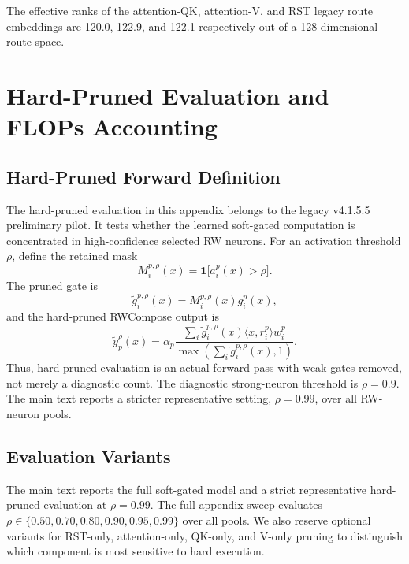 \documentclass{article}
\begin{document}
The effective ranks of the attention-QK, attention-V, and RST legacy route embeddings are 120.0, 122.9, and 122.1 respectively out of a 128-dimensional route space.


\section{Hard-Pruned Evaluation and FLOPs Accounting}
\label{app:hard_pruned_eval}
\label{app:flops_accounting_40m}

\subsection{Hard-Pruned Forward Definition}

The hard-pruned evaluation in this appendix belongs to the legacy v4.1.5.5 preliminary pilot. It tests whether the learned soft-gated computation is concentrated in high-confidence selected RW neurons. For an activation threshold $\rho$, define the retained mask
\begin{equation}
    M_i^{p,\rho}(x)=\mathbf{1}\bigl[a_i^p(x)>\rho\bigr].
\end{equation}
The pruned gate is
\begin{equation}
    \tilde g_i^{p,\rho}(x)=M_i^{p,\rho}(x)g_i^p(x),
\end{equation}
and the hard-pruned RWCompose output is
\begin{equation}
    \tilde y_p^\rho(x)=\alpha_p
    \frac{\sum_i \tilde g_i^{p,\rho}(x)\langle x,r_i^p\rangle w_i^p}
    {\max(\sum_i \tilde g_i^{p,\rho}(x),1)} .
\end{equation}
Thus, hard-pruned evaluation is an actual forward pass with weak gates removed, not merely a diagnostic count. The diagnostic strong-neuron threshold is $\rho=0.9$. The main text reports a stricter representative setting, $\rho=0.99$, over all RW-neuron pools.

\subsection{Evaluation Variants}

The main text reports the full soft-gated model and a strict representative hard-pruned evaluation at $\rho=0.99$. The full appendix sweep evaluates $\rho\in\{0.50,0.70,0.80,0.90,0.95,0.99\}$ over all pools. We also reserve optional variants for RST-only, attention-only, QK-only, and V-only pruning to distinguish which component is most sensitive to hard execution.
\end{document}
